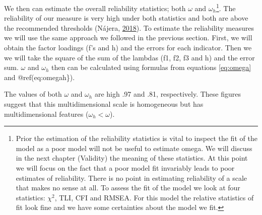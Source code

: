 \documentclass[]{book}
\let\rmarkdownfootnote\footnote%
\def\footnote{\protect\rmarkdownfootnote}
\begin{document}
We then can estimate the overall reliability statistics; both \(\omega\) and \(\omega_h\)\footnote{Prior the estimation of the reliability statistics is vital to inspect the fit of the model as a poor model will not be useful to estimate omega. We will discuss in the next chapter (Validity) the meaning of these statistics. At this point we will focus on the fact that a poor model fit invariably leads to poor estimates of reliability. There is no point in estimating reliability of a scale that makes no sense at all. To assess the fit of the model we look at four statistics: \(\chi^2\), TLI, CFI and RMSEA. For this model the relative statistics of fit look fine and we have some certainties about the model we fit.}. The reliability of our measure is very high under both statistics and both are above the recommended thresholds (Nájera, \protect\hyperlink{ref-Najera2018}{2018}). To estimate the reliability measures we will use the same approach we followed in the previous section. First, we will obtain the factor loadings (f's and h) and the errors for each indicator. Then we we will take the square of the sum of the lambdas (f1, f2, f3 and h) and the error sum. \(\omega\) and \(\omega_h\) then can be calculated using formulas from equations \eqref{eq:omega} and @ref(eq:omegah\}).

The values of both \(\omega\) and \(\omega_h\) are high .97 and .81, respectively. These figures suggest that this multidimensional scale is homogeneous but has multidimensional features (\(\omega_h<\omega\)).
\end{document}
